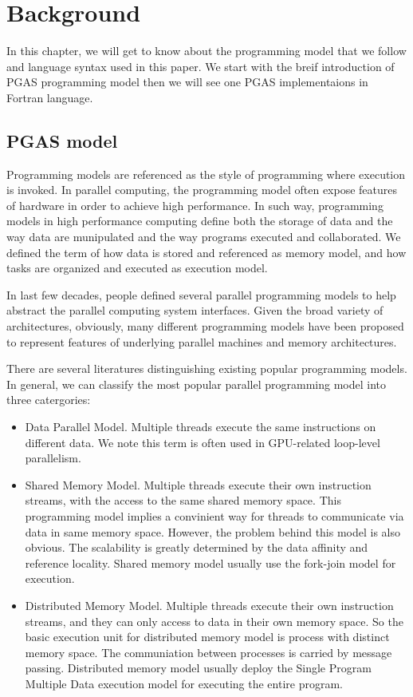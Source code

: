 \chapter{Background}\label{chap:Background}
In this chapter, we will get to know about the programming model that we follow and language syntax used in this paper. We start with the breif introduction of PGAS programming model then we will see one PGAS implementaions in Fortran language. 
\section{PGAS model}
Programming models are referenced as the style of programming where execution is invoked. In parallel computing, the programming model often expose features of hardware in order to achieve high performance. In such way, programming models in high performance computing define both the storage of data and the way data are munipulated and the way programs executed and collaborated. We defined the term of how data is stored and referenced as memory model, and how tasks are organized and  executed as execution model. 

In last few decades, people defined several parallel programming models to help abstract the parallel computing system interfaces. Given the broad variety of architectures, obviously, many different programming models have been proposed to represent features of underlying parallel machines and memory architectures. 

There are several literatures distinguishing existing popular programming models\cite{kasim2008survey}\cite{diaz2012survey}. In general, we can classify the most popular parallel programming model into three catergories:
\begin{itemize}
\item Data Parallel Model. Multiple threads execute the same instructions on different data. We note this term is often used in GPU-related loop-level parallelism.
\item Shared Memory Model. Multiple threads execute their own instruction streams, with the access to the same shared memory space. This programming model implies a convinient way for threads to communicate via data in same memory space. However, the problem behind this model is also obvious. The scalability is greatly determined by the data affinity and reference locality. Shared memory model usually use the fork-join model for execution. 
\item Distributed Memory Model. Multiple threads execute their own instruction streams, and they can only access to data in their own memory space. So the basic execution unit for distributed memory model is process with distinct memory space. The communiation between processes is carried by message passing. Distributed memory model usually deploy the Single Program Multiple Data execution model for executing the entire program. 
\end{itemize}

